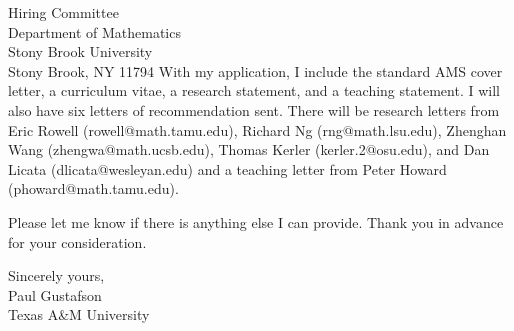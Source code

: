\documentclass[11pt]{letter} %
\begin{document}
\begin{letter}{Hiring Committee \\
Department of Mathematics \\
Stony Brook University \\
Stony Brook, NY 11794}
With my application, I include the standard AMS cover letter, a curriculum vitae, a research statement, and a teaching statement. I will also have six letters of recommendation sent. There will be research letters from Eric Rowell (rowell@math.tamu.edu),  Richard Ng (rng@math.lsu.edu), Zhenghan Wang (zhengwa@math.ucsb.edu), Thomas Kerler (kerler.2@osu.edu), and Dan Licata (dlicata@wesleyan.edu) and a teaching letter from Peter Howard \\ (phoward@math.tamu.edu).

Please let me know if there is anything else I can provide. Thank you in
advance for your consideration.

\closing{Sincerely yours,\\ Paul Gustafson \\ Texas A\&M University}




\end{letter}
\end{document}
